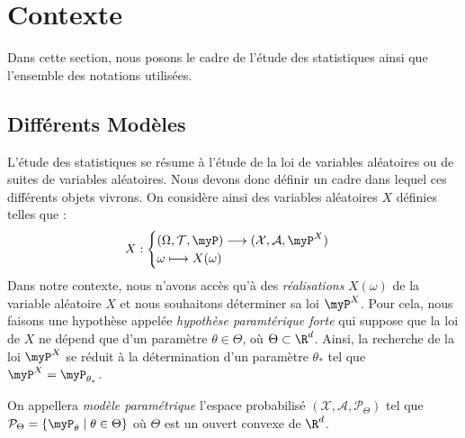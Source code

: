 
\minitoc 





\section{Contexte}

Dans cette section, nous posons le cadre de l'étude des statistiques ainsi que l'ensemble 
des notations utilisées. 

\subsection{Différents Modèles}

L'étude des statistiques se résume à l'étude de la loi de variables aléatoires ou de suites de 
variables aléatoires. Nous devons donc définir un cadre dans lequel ces différents objets vivrons. 
On considère ainsi des variables aléatoires $X$ définies telles que : 
\begin{equation}
    X : 
        \begin{cases}
            ( \Omega, \mathcal{T}, \myP) \longrightarrow (\mathcal{X}, \mathcal{A}, \myP^X) \\ 
            \omega \longmapsto X( \omega)
        \end{cases}    
\end{equation}
Dans notre contexte, nous n'avons accès qu'à des \emph{réalisations} $X( \omega)$ de la variable 
aléatoire $X$ et nous souhaitons déterminer sa loi $ \myP^X$. 
Pour cela, nous faisons une hypothèse appelée \emph{hypothèse paramtérique forte} qui suppose que 
la loi de $X$ ne dépend que d'un paramètre $ \theta \in \Theta$, où $ \Theta \subset \R^d$. 
Ainsi, la recherche de la loi $ \myP^X$ se réduit à la détermination d'un paramètre $ \theta_*$ tel 
que $ \myP^X = \myP_{\theta_*}$. 

\begin{definition}
    On appellera \emph{modèle paramétrique} l'espace probabilisé $( \mathcal{X}, \mathcal{A}, \mathcal{P}_\Theta)$ 
    tel que $ \mathcal{P}_\Theta = \{ \myP_\theta \mid \theta \in \Theta\}$ où $ \Theta$ est un ouvert convexe 
    de $ \R^d$. 
\end{definition}

